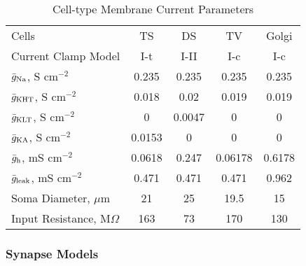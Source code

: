 \smallskip{}

\begin{table}[tp]
  \centering
  \caption{Cell-type Membrane Current Parameters}\label{tab:GA:CellTypes}
  \begin{tabularx}{0.8\linewidth}{lcccc}\toprule
                Cells                 &   TS   &   DS   &   TV    & Golgi \\ %
         Current Clamp Model          &  I-t   &  I-II  &   I-c   & I-c \\[0.5ex] \midrule
 $\bar{g}_{{\rm Na}} $, S cm$^{-2}$   & 0.235  & 0.235  &  0.235  & 0.235 \\ %
 $\bar{g}_{{\rm KHT}} $, S cm$^{-2}$  & 0.018  &  0.02  &  0.019  & 0.019 \\ %
$\bar{g}_{{\rm  KLT}} $, S cm$^{-2}$  &   0    & 0.0047 &    0    & 0 \\ %
 $\bar{g}_{{\rm KA}} $, S cm$^{-2}$   & 0.0153 &   0    &    0    & 0 \\ %
 $\bar{g}_{{\rm h}} $, mS cm$^{-2}$   & 0.0618 & 0.247  & 0.06178 & 0.6178 \\ %
$\bar{g}_{{\rm leak}} $, mS cm$^{-2}$ & 0.471  & 0.471  &  0.471  & 0.962 \\ %
        Soma Diameter, $\mu$m     &   21   &   25   &  19.5   & 15 \\ %
    Input Resistance, M$\Omega$   &  163   &   73   &   170   & 130 \\ 
\bottomrule
\end{tabularx}
\end{table}



\subsubsection{Synapse Models}

